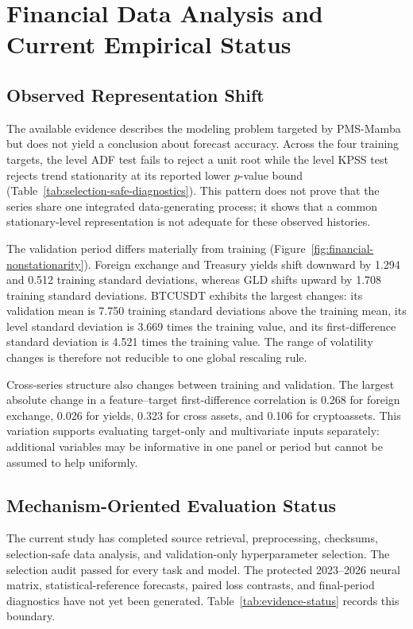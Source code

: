 \section{Financial Data Analysis and Current Empirical Status}

\subsection{Observed Representation Shift}

The available evidence describes the modeling problem targeted by PMS-Mamba but does not yield a conclusion about forecast accuracy.
Across the four training targets, the level ADF test fails to reject a unit root while the level KPSS test rejects trend stationarity at its reported lower $p$-value bound (Table~\ref{tab:selection-safe-diagnostics}).
This pattern does not prove that the series share one integrated data-generating process; it shows that a common stationary-level representation is not adequate for these observed histories.

The validation period differs materially from training (Figure~\ref{fig:financial-nonstationarity}).
Foreign exchange and Treasury yields shift downward by 1.294 and 0.512 training standard deviations, whereas GLD shifts upward by 1.708 training standard deviations.
BTCUSDT exhibits the largest changes: its validation mean is 7.750 training standard deviations above the training mean, its level standard deviation is 3.669 times the training value, and its first-difference standard deviation is 4.521 times the training value.
The range of volatility changes is therefore not reducible to one global rescaling rule.

Cross-series structure also changes between training and validation.
The largest absolute change in a feature--target first-difference correlation is 0.268 for foreign exchange, 0.026 for yields, 0.323 for cross assets, and 0.106 for cryptoassets.
This variation supports evaluating target-only and multivariate inputs separately: additional variables may be informative in one panel or period but cannot be assumed to help uniformly.

\subsection{Mechanism-Oriented Evaluation Status}

The current study has completed source retrieval, preprocessing, checksums, selection-safe data analysis, and validation-only hyperparameter selection.
The selection audit passed for every task and model.
The protected 2023--2026 neural matrix, statistical-reference forecasts, paired loss contrasts, and final-period diagnostics have not yet been generated.
Table~\ref{tab:evidence-status} records this boundary.

